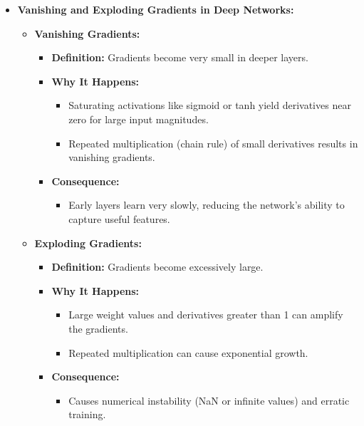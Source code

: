 \documentclass{article}
\begin{document}
\begin{itemize}
    \item \textbf{Vanishing and Exploding Gradients in Deep Networks:}
    \begin{itemize}
        \item \textbf{Vanishing Gradients:}
        \begin{itemize}
            \item \textbf{Definition:} Gradients become very small in deeper layers.
            \item \textbf{Why It Happens:}
            \begin{itemize}
                \item Saturating activations like sigmoid or tanh yield derivatives near zero for large input magnitudes.
                \item Repeated multiplication (chain rule) of small derivatives results in vanishing gradients.
            \end{itemize}
            \item \textbf{Consequence:}
            \begin{itemize}
                \item Early layers learn very slowly, reducing the network's ability to capture useful features.
            \end{itemize}
        \end{itemize}
        
        \item \textbf{Exploding Gradients:}
        \begin{itemize}
            \item \textbf{Definition:} Gradients become excessively large.
            \item \textbf{Why It Happens:}
            \begin{itemize}
                \item Large weight values and derivatives greater than 1 can amplify the gradients.
                \item Repeated multiplication can cause exponential growth.
            \end{itemize}
            \item \textbf{Consequence:}
            \begin{itemize}
                \item Causes numerical instability (NaN or infinite values) and erratic training.
            \end{itemize}
        \end{itemize}
    \end{itemize}
    

\end{itemize}
\end{document}
